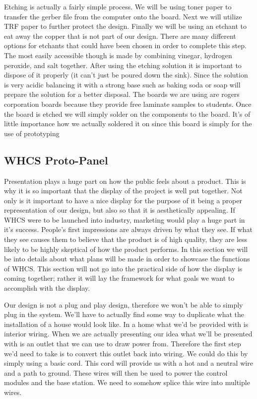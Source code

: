 Etching is actually a fairly simple process. We will be using
toner paper to transfer the gerber file from the computer onto the board. Next
we will utilize TRF paper to further protect the design. Finally we will be
using an etchant to eat away the copper that is not part of our design. There
are many different options for etchants that could have been chosen in order to
complete this step. The most easily accessible though is made by combining
vinegar, hydrogen peroxide, and salt together. After using the etching solution
it is important to dispose of it properly (it can{}'t just be poured down the
sink). Since the solution is very acidic balancing it with a strong base such
as baking soda or soap will prepare the solution for a better disposal. The
boards we are using are rogers corporation boards because they provide free
laminate samples to students. Once the board is etched we will simply solder on
the components to the board. It{}'s of little importance how we actually
soldered it on since this board is simply for the use of prototyping

\subsection{WHCS Proto-Panel}
\label{sec:proto-panel-proto}
Presentation plays a huge part on how the public feels about a product. This is
why it is so important that the display of the project is well put together.
Not only is it important to have a nice display for the purpose of it being a
proper representation of our design, but also so that it is aesthetically
appealing. If WHCS were to be launched into industry, marketing would play a
huge part in it{}'s success. People{}'s first impressions are always driven by
what they see. If what they see causes them to believe that the product is of
high quality, they are less likely to be highly skeptical of how the product
performs. In this section we will be into details about what plans will be made
in order to showcase the functions of WHCS. This section will not go into the
practical side of how the display is coming together; rather it will lay the framework for what goals we want to
accomplish with the display.

Our design is not a plug and play design, therefore we won{}'t
be able to simply plug in the system. We{}'ll have to actually find some way to
duplicate what the installation of a house would look like. In a home what
we{}'d be provided with is interior wiring. When we are actually presenting our
idea what we{}'ll be presented with is an outlet that we can use to draw power
from. Therefore the first step we{}'d need to take is to convert this outlet
back into wiring. We could do this by simply using a basic cord. This cord will
provide us with a hot and a neutral wire and a path to ground. These wires will
then be used to power the control modules and the base station. We need to
somehow splice this wire into multiple wires.

